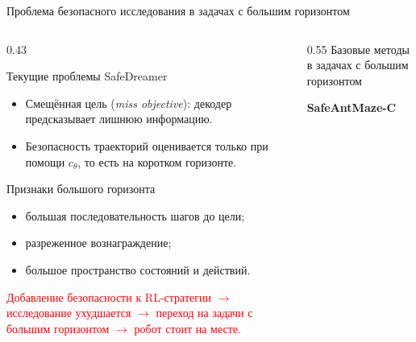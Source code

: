 \begin{frame}[shrink=8]{Проблема безопасного исследования в задачах с большим горизонтом}
    \begin{columns}[T,onlytextwidth]
        \begin{column}{0.43\textwidth}
            \footnotesize
            \begin{alertblock}{Текущие проблемы SafeDreamer}
                \begin{itemize}
                    \item Смещённая цель (\textit{miss objective}): декодер
                    предсказывает лишнюю информацию.
                    \item Безопасность траекторий оценивается только при помощи
                    \(c_\theta\), то есть на коротком горизонте.
                \end{itemize}
            \end{alertblock}

            \vspace{0.35em}
            \begin{block}{Признаки большого горизонта}
            \begin{itemize}
                \item большая последовательность шагов до цели;
                \item разреженное вознаграждение;
                \item большое пространство состояний и действий.
            \end{itemize}
            \end{block}

            \vspace{0.35em}
            \textcolor{red}{Добавление безопасности к RL-стратегии $\rightarrow$
            исследование ухудшается $\rightarrow$
            переход на задачи с большим горизонтом $\rightarrow$
            робот стоит на месте.}
        \end{column}

        \begin{column}{0.55\textwidth}
            \centering
            \scriptsize
            Базовые методы в задачах с большим горизонтом

            \vspace{0.25em}
            \textbf{SafeAntMaze-C}
            \vspace{0.1em}


\end{column}
\end{columns}
\end{frame}
